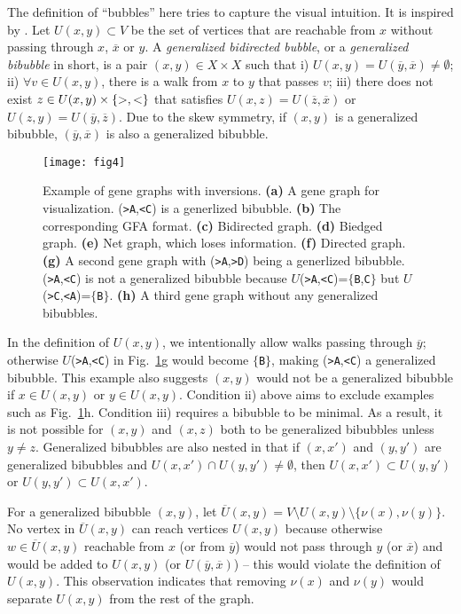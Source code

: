 \documentclass[webpdf,contemporary,large,namedate]{oup-authoring-template}%
\begin{document}
The definition of ``bubbles'' here tries to capture the visual intuition.
It is inspired by \citet{DBLP:conf/wabi/OnoderaSS13}.
Let $U(x,y)\subset V$ be the set of vertices that are reachable from $x$ without passing through $x$, $\overline{x}$ or $y$.
A \emph{generalized bidirected bubble}, or a \emph{generalized bibubble} in short, is a pair $(x,y)\in X\times X$ such that
i) $U(x,y)=U(\overline{y},\overline{x})\not=\emptyset$;
ii) $\forall v\in U(x,y)$, there is a walk from $x$ to $y$ that passes $v$;
iii) there does not exist $z\in U(x,y)\times\{{\rm >},{\rm <}\}$
that satisfies $U(x,z)=U(\overline{z},\overline{x})$ or $U(z,y)=U(\overline{y},\overline{z})$.
Due to the skew symmetry, if $(x,y)$ is a generalized bibubble, $(\overline{y},\overline{x})$ is also a generalized bibubble.

\begin{figure}[t!]
\centering
\texttt{[image: fig4]}
\caption{Example of gene graphs with inversions.
{\bf (a)} A gene graph for visualization. ({\tt >A},{\tt <C}) is a generlized bibubble.
{\bf (b)} The corresponding GFA format.
{\bf (c)} Bidirected graph.
{\bf (d)} Biedged graph.
{\bf (e)} Net graph, which loses information.
{\bf (f)} Directed graph.
{\bf (g)} A second gene graph with ({\tt >A},{\tt >D}) being a generlized bibubble.
({\tt >A},{\tt <C}) is not a generalized bibubble because $U$({\tt >A},{\tt <C})=$\{${\tt B},{\tt C}$\}$
but $U$({\tt >C},{\tt <A})=$\{${\tt B}$\}$.
{\bf (h)} A third gene graph without any generalized bibubbles.
}\label{fig:inv}
\end{figure}

In the definition of $U(x,y)$, we intentionally allow walks passing through $\overline{y}$;
otherwise $U$({\tt >A},{\tt <C}) in Fig.~\ref{fig:inv}g would become $\{${\tt B}$\}$, making ({\tt >A},{\tt <C}) a generalized bibubble.
This example also suggests $(x,y)$ would not be a generalized bibubble if $x\in U(x,y)$ or $y\in U(x,y)$.
Condition ii) above aims to exclude examples such as Fig.~\ref{fig:inv}h.
Condition iii) requires a bibubble to be minimal.
As a result, it is not possible for $(x,y)$ and $(x,z)$ both to be generalized bibubbles unless $y\not=z$.
Generalized bibubbles are also nested in that
if $(x,x')$ and $(y,y')$ are generalized bibubbles and $U(x,x')\cap U(y,y')\not=\emptyset$,
then $U(x,x')\subset U(y,y')$ or $U(y,y')\subset U(x,x')$.

For a generalized bibubble $(x,y)$, let $\overline{U}(x,y)=V\setminus U(x,y)\setminus\{\nu(x),\nu(y)\}$.
No vertex in $\overline{U}(x,y)$ can reach vertices $U(x,y)$
because otherwise $w\in\overline{U}(x,y)$ reachable from $x$ (or from $\overline{y}$)
would not pass through $y$ (or $\overline{x}$) and would be added to $U(x,y)$ (or $U(\overline{y},\overline{x})$)
-- this would violate the definition of $U(x,y)$.
This observation indicates that removing $\nu(x)$ and $\nu(y)$ would separate $U(x,y)$ from the rest of the graph.
\end{document}
